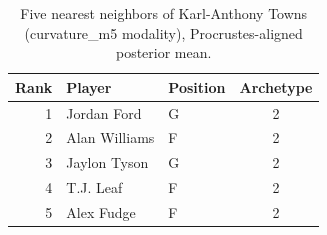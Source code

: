 \begin{table}[htbp]
  \centering\small
  \begin{tabular}{rllc}
    \toprule
    Rank & Player & Position & Archetype \\
    \midrule
    1 & Jordan Ford & G & 2 \\
    2 & Alan Williams & F & 2 \\
    3 & Jaylon Tyson & G & 2 \\
    4 & T.J. Leaf & F & 2 \\
    5 & Alex Fudge & F & 2 \\
    \bottomrule
  \end{tabular}
  \caption{Five nearest neighbors of Karl-Anthony Towns (curvature_m5 modality), Procrustes-aligned posterior mean.}
  \label{tab:Karl_Anthony_Towns_neighbors_curvature_m5}
\end{table}

